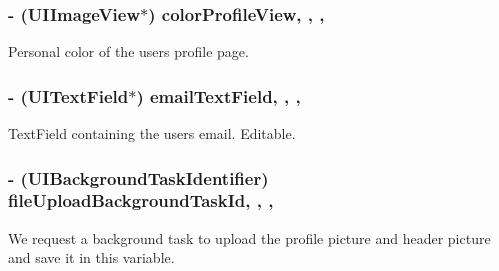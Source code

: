 \subsubsection[{color\+Profile\+View}]{\setlength{\rightskip}{0pt plus 5cm}-\/ (U\+I\+Image\+View$\ast$) color\+Profile\+View\hspace{0.3cm}{\ttfamily [read]}, {\ttfamily [write]}, {\ttfamily [nonatomic]}, {\ttfamily [strong]}}\label{interface_e_s_edit_profile_view_controller_a8f938b0e95d8fa36867f783fb2191a2f}
Personal color of the user\textquotesingle{}s profile page. \hypertarget{interface_e_s_edit_profile_view_controller_af29c5de6d2c00437c8d7eb6de1dc39a6}{}
\subsubsection[{email\+Text\+Field}]{\setlength{\rightskip}{0pt plus 5cm}-\/ (U\+I\+Text\+Field$\ast$) email\+Text\+Field\hspace{0.3cm}{\ttfamily [read]}, {\ttfamily [write]}, {\ttfamily [nonatomic]}, {\ttfamily [strong]}}\label{interface_e_s_edit_profile_view_controller_af29c5de6d2c00437c8d7eb6de1dc39a6}
Text\+Field containing the user\textquotesingle{}s email. Editable. \hypertarget{interface_e_s_edit_profile_view_controller_a4134bbf56b56be78fe28a1e7891d6414}{}
\subsubsection[{file\+Upload\+Background\+Task\+Id}]{\setlength{\rightskip}{0pt plus 5cm}-\/ (U\+I\+Background\+Task\+Identifier) file\+Upload\+Background\+Task\+Id\hspace{0.3cm}{\ttfamily [read]}, {\ttfamily [write]}, {\ttfamily [nonatomic]}, {\ttfamily [assign]}}\label{interface_e_s_edit_profile_view_controller_a4134bbf56b56be78fe28a1e7891d6414}
We request a background task to upload the profile picture and header picture and save it in this variable. \hypertarget{interface_e_s_edit_profile_view_controller_a8bd2fcffae0d056383f32f204826874e}{}
